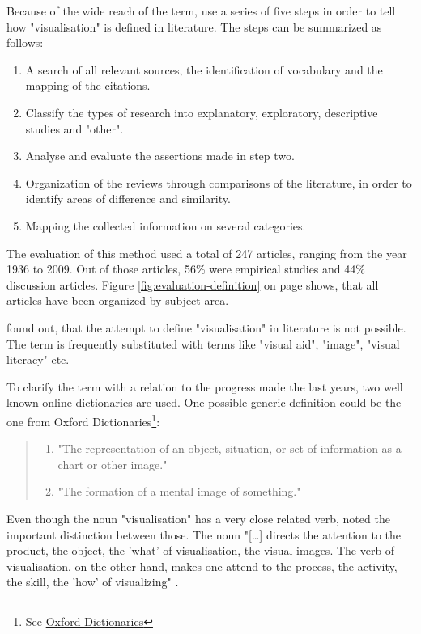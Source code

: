 Because of the wide reach of the term, \citeauthor{Phillips2010} use a series of five steps in order to tell how "visualisation" is defined in literature. The steps can be summarized as follows:
\begin{enumerate}
\item A search of all relevant sources, the identification of vocabulary and the mapping of the citations.
\item Classify the types of research into explanatory, exploratory, descriptive studies and "other".
\item Analyse and evaluate the assertions made in step two.
\item Organization of the reviews through comparisons of the literature, in order to identify areas of difference and similarity.
\item Mapping the collected information on several categories.
\end{enumerate}
The evaluation of this method used a total of 247 articles, ranging from the year 1936 to 2009. Out of those articles, 56\% were empirical studies and 44\% discussion articles. Figure \ref{fig:evaluation-definition} on page \pageref{fig:evaluation-definition} shows, that all articles have been organized by subject area.


\citeauthor{Phillips2010} found out, that the attempt to define "visualisation" in literature is not possible. The term is frequently substituted with terms like "visual aid", "image", "visual literacy" etc.

To clarify the term with a relation to the progress made the last years, two well known online dictionaries are used. One possible generic definition could be the one from Oxford Dictionaries\footnote{See \href{https://www.oxforddictionaries.com/definition/english/visualisation}{Oxford Dictionaries}}:

\begin{quote}
\begin{enumerate}
\item "The representation of an object, situation, or set of information as a chart or other image."
\item "The formation of a mental image of something."
\end{enumerate}
\end{quote}

Even though the noun "visualisation" has a very close related verb, \citeauthor{Phillips2010} noted the important distinction between those. The noun "[\ldots] directs the attention to the product, the object, the 'what' of visualisation, the visual images. The verb of visualisation, on the other hand, makes one attend to the process, the activity, the skill, the 'how' of visualizing" .

